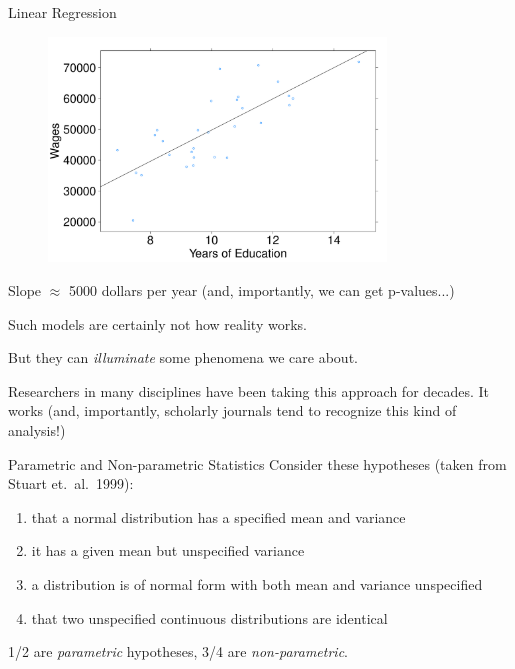 \documentclass{beamer}
\begin{document}
\begin{frame}{Linear Regression}
\begin{figure}
\centering
\includegraphics[width=0.8\textwidth]{linreg_plot_2}
\label{fig:linreg_plot_2}
\end{figure}

Slope $\approx$ 5000 dollars per year (and, importantly, we can get p-values...)
\end{frame}

\begin{frame}
Such models are certainly not how reality works.

\vspace{20px}

But they can \emph{illuminate} some phenomena we care about.

\vspace{20px}

Researchers in many disciplines have been taking this approach for decades. It works (and, importantly, scholarly journals tend to recognize this kind of analysis!)
\end{frame}

\begin{frame}{Parametric and Non-parametric Statistics}
Consider these hypotheses (taken from Stuart et.\ al.\ 1999):
\begin{enumerate}
\item that a normal distribution has a specified mean and variance
\item it has a given mean but unspecified variance
\item a distribution is of normal form with both mean and variance unspecified
\item that two unspecified continuous distributions are identical
\end{enumerate}
\vspace{10px}
1/2 are \emph{parametric} hypotheses, 3/4 are \emph{non-parametric}.
\end{frame}
\end{document}
